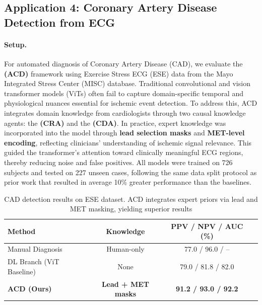 \documentclass[runningheads]{llncs}
\begin{document}
\vspace{-11mm}
\subsection{Application 4: Coronary Artery Disease Detection from ECG}

\paragraph{Setup.}
For automated diagnosis of Coronary Artery Disease (CAD), we evaluate the \textbf{(ACD)} framework using Exercise Stress ECG (ESE) data from the Mayo Integrated Stress Center (MISC) database. 
Traditional convolutional and vision transformer models (ViTs) often fail to capture domain-specific temporal and physiological nuances essential for ischemic event detection. 
To address this, ACD integrates domain knowledge from cardiologists through two causal knowledge agents: the \textbf{(CRA)} and the \textbf{(CDA)}.
In practice, expert knowledge was incorporated into the model through \textbf{lead selection masks} and \textbf{MET-level encoding}, reflecting clinicians’ understanding of ischemic signal relevance. 
This guided the transformer’s attention toward clinically meaningful ECG regions, thereby reducing noise and false positives.  
All models were trained on 726 subjects and tested on 227 unseen cases, following the same data split protocol as prior work that resulted in average 10\% greater performance than the baselines. 

\begin{table}[!htbp]
\centering
\scriptsize
\setlength{\tabcolsep}{4pt} %
\caption{CAD detection results on ESE dataset. ACD integrates expert priors via lead and MET masking, yielding superior results}
\begin{tabular}{lccc}
\toprule
\textbf{Method} & \textbf{Knowledge} & \textbf{PPV / NPV / AUC (\%)} \\
\midrule
Manual Diagnosis & Human-only & 77.0 / 96.0 / – \\
DL Branch (ViT Baseline) & None & 79.0 / 81.8 / 82.0 \\
\textbf{ACD (Ours)} & \textbf{Lead + MET masks} & \textbf{91.2 / 93.0 / 92.2} \\
\bottomrule
\end{tabular}

\label{tab:cad_results}
\end{table}
\vspace{-11mm}
\end{document}
